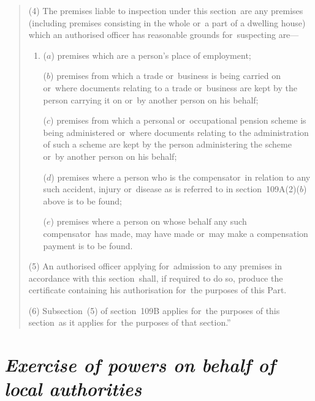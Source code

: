 \documentclass[12pt,a4paper]{article}
\begin{document}
\begin{quotation}
(4) The premises liable to inspection under this section~are any premises (including premises consisting in the whole or~a part of a dwelling house) which an authorised officer has reasonable grounds for~suspecting are—
\begin{enumerate}\item[]
($a$) premises which are a person’s place of employment;

($b$) premises from which a trade or~business is being carried on or~where documents relating to a trade or~business are kept by the person carrying it on or~by another person on his behalf;

($c$) premises from which a personal or~occupational pension scheme is being administered or~where documents relating to the administration of such a scheme are kept by the person administering the scheme or~by another person on his behalf;

($d$) premises where a person who is the compensator~in relation to any such accident, injury or~disease as is referred to in section~109A(2)($b$)  above is to be found;

($e$) premises where a person on whose behalf any such compensator~has made, may have made or~may make a compensation payment is to be found.
\end{enumerate}

\begin{sloppypar}
(5) An authorised officer applying for~admission to any premises in accordance with this section~shall, if required to do so, produce the certificate containing his authorisation for~the purposes of this Part.
\end{sloppypar}

(6) Subsection~(5)  of section~109B applies for~the purposes of this section~as it applies for~the purposes of that section.”
\end{quotation}

\section*{\itshape Exercise of powers on behalf of local authorities}
\end{document}
